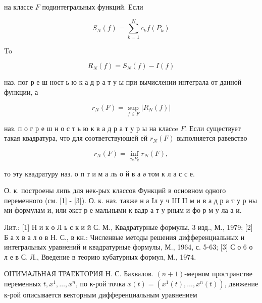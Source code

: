 \documentclass[10pt]{article}
\begin{document}
на классе $F$ подинтегральных функций. Если



\[

S_{N}(f)=\sum_{k=1}^{N} c_{k} f\left(P_{k}\right)

\]



To



\[

R_{N}(f)=S_{N}(f)-I(f)

\]



наз. пог р е ш ност ь ю к а д р а т у ы при вычислении интеграла от данной функции, а



\[

r_{N}(F)=\sup _{f \in F}\left|R_{N}(f)\right|

\]



наз. п о г р е ш н о с т ь ю к в а д р а т у р ы на класce $F$. Если существует такая квадратура, что для соответствующей ей $r_{N}(F)$ выполняется равевство



\[

r_{N}(F)=\inf _{c_{k} P_{k}} r_{N}(F),

\]



то эту квадратуру наз. о п т и $м$ а ль о й в а ә том к л а с с е.



О. к. построены липь для нек-рых классов Функций в основном одного переменного (см. [1] - [3]). О. к. наз. также н а Iл у ч III II м и в а д р а т у р ны ми формулам и, или әкст р е мальными к вадр а т у рным и фо р м у ла а и.



Лит.: [1] Н и к о Л ь с к и й С. М., Квадратурные формулы, 3 изд., М., 1979; [2] Б а х в а л о в Н. С., в кн.: Численвые методы решения дифференциальных и интегральных уравнений и квадратурные формулы, М., 1964, с. 5-63; [3] С о 6 о л е в С. Л., Введение в теорию кубатурных формул, М., 1974.



ОІТИМАЛЬНАЯ ТРАЕКТОРИЯ Н. С. Бахвалов. $(n+1)$-мерном пространстве переменных $t, x^{1}, \ldots, x^{n}$, по к-рой точка $x(t)=\left(x^{1}(t), \ldots, x^{n}(t)\right)$, движение к-рой описывается векторным дифференциальным уравнением
\end{document}
